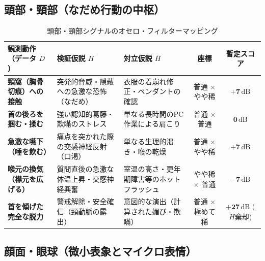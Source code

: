\subsection{頭部・頸部（なだめ行動の中枢）}

\begin{table}[htbp]
\centering
\small
\caption{頭部・頸部シグナルのオセロ・フィルターマッピング}
\label{tab:dict_head_neck}
\begin{tabular}{p{3.8cm}p{3.6cm}p{3.6cm}cc}
\toprule
\textbf{観測動作（データ $D$）} & \textbf{検証仮説 $H$} & \textbf{対立仮説 $\bar{H}$} & \textbf{座標} & \textbf{暫定スコア} \\
\midrule
\textbf{頸窩（胸骨切痕）への接触} & 突発的脅威・隠蔽への急激な恐怖（なだめ） & 衣服の着崩れ修正・ペンダントの確認 & 普通 $\times$ やや稀 & $\mathbf{+7\,\mathrm{dB}}$ \\
\textbf{首の後ろを掴む・揉む} & 強い認知的葛藤・欺瞞のストレス & 単なる長時間のPC作業による肩こり & 普通 $\times$ 普通 & $\mathbf{0\,\mathrm{dB}}$ \\
\textbf{急激な嚥下（唾を飲む）} & 痛点を突かれた際の交感神経反射（口渇） & 単なる生理的渇き・喉の乾燥 & 普通 $\times$ やや稀 & $\mathbf{+7\,\mathrm{dB}}$ \\
\textbf{喉元の換気（襟元を広げる）} & 質問直後の急激な体温上昇・交感神経興奮 & 室温の高さ・更年期障害等のホットフラッシュ & やや稀 $\times$ 普通 & $\mathbf{-7\,\mathrm{dB}}$ \\
\textbf{首を傾げた完全な脱力} & 警戒解除・安全確信（頸動脈の露出） & 意図的な演出（計算された媚び・欺瞞） & 普通 $\times$ 極めて稀 & $\mathbf{+27\,\mathrm{dB}}$ ($\bar{H}$棄却) \\
\bottomrule
\end{tabular}
\end{table}

\subsection{顔面・眼球（微小表象とマイクロ表情）}

